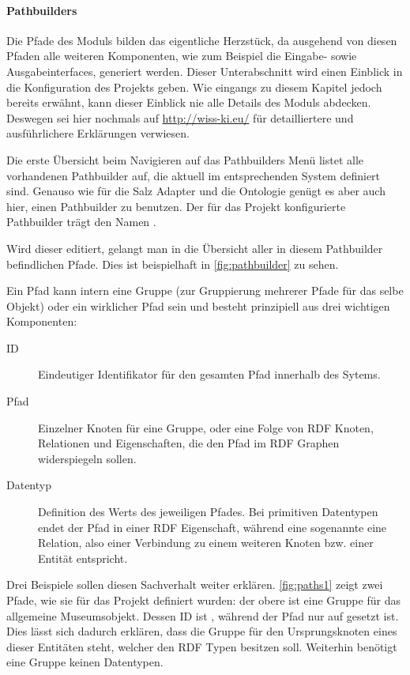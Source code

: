 \paragraph{Pathbuilders}

Die Pfade des \wisski Moduls bilden das eigentliche Herzstück, da ausgehend von diesen Pfaden alle weiteren Komponenten, wie zum Beispiel die Eingabe- sowie Ausgabeinterfaces, generiert werden. Dieser Unterabschnitt wird einen Einblick in die Konfiguration des \visit Projekts geben. Wie eingangs zu diesem Kapitel jedoch bereits erwähnt, kann dieser Einblick nie alle Details des Moduls abdecken. Deswegen sei hier nochmals auf \url{http://wiss-ki.eu/} für detailliertere und ausführlichere Erklärungen verwiesen.

Die erste Übersicht beim Navigieren auf das Pathbuilders Menü listet alle vorhandenen Pathbuilder auf, die aktuell im entsprechenden \wisski System definiert sind. Genauso wie für die Salz Adapter und die Ontologie genügt es aber auch hier, einen Pathbuilder zu benutzen. Der für das \visit Projekt konfigurierte Pathbuilder trägt den Namen \texttt{}.

Wird dieser editiert, gelangt man in die Übersicht aller in diesem Pathbuilder befindlichen Pfade. Dies ist beispielhaft in \autoref{fig:pathbuilder} zu sehen.

Ein \wisski Pfad kann intern eine Gruppe (zur Gruppierung mehrerer Pfade für das selbe Objekt) oder ein wirklicher Pfad sein und besteht prinzipiell aus drei wichtigen Komponenten:

\begin{description}
	\item[ID] Eindeutiger Identifikator für den gesamten Pfad innerhalb des \wisski Sytems.
	\item[Pfad] Einzelner Knoten für eine Gruppe, oder eine Folge von RDF Knoten, Relationen und Eigenschaften, die den Pfad im RDF Graphen widerspiegeln sollen.
	\item[Datentyp] Definition des Werts des jeweiligen Pfades. Bei primitiven Datentypen endet der Pfad in einer RDF Eigenschaft, während eine sogenannte \texttt{} eine Relation, also einer Verbindung zu einem weiteren Knoten bzw. einer \wisski Entität entspricht.
\end{description}

Drei Beispiele sollen diesen Sachverhalt weiter erklären. \autoref{fig:paths1} zeigt zwei Pfade, wie sie für das \visit Projekt definiert wurden: der obere  ist eine Gruppe für das allgemeine Museumsobjekt. Dessen ID ist \texttt{}, während der Pfad nur auf \texttt{} gesetzt ist. Dies lässt sich dadurch erklären, dass die Gruppe für den Ursprungsknoten eines dieser Entitäten steht, welcher den RDF Typen \texttt{} besitzen soll. Weiterhin benötigt eine Gruppe keinen Datentypen.

